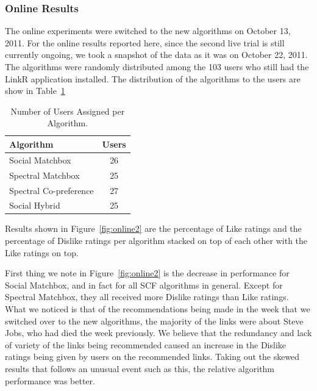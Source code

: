 \subsubsection{Online Results}
\label{sec:online2}

The online experiments were switched to the new algorithms on October
13, 2011. For the online results reported here, since the second live
trial is still currently ongoing, we took a snapshot of the data as it
was on October 22, 2011. The algorithms were randomly distributed
among the 103 users who still had the LinkR application installed. The
distribution of the algorithms to the users are show in
Table~\ref{tab:assigned2}


\begin{table}[t!]
\centering
\begin{tabular}{| l | c |}
\hline
{\bf Algorithm} & {\bf Users} \\
\hline
Social Matchbox & 26\\
Spectral Matchbox  & 25 \\
Spectral Co-preference & 27 \\
Social Hybrid & 25 \\
\hline
\end{tabular}
\caption{Number of Users Assigned per Algorithm.}
\label{tab:assigned2}
\end{table}

Results shown in Figure~\ref{fig:online2} are the percentage of Like
ratings and the percentage of Dislike ratings per algorithm stacked on
top of each other with the Like ratings on top.

First thing we note in Figure~\ref{fig:online2} is the decrease in
performance for Social Matchbox, and in fact for all SCF algorithms in
general. Except for Spectral Matchbox, they all received more Dislike
ratings than Like ratings. What we noticed is that of the
recommendations being made in the week that we switched over to the
new algorithms, the majority of the links were about Steve Jobs, who
had died the week previously. We believe that the redundancy and lack
of variety of the links being recommended caused an increase in the
Dislike ratings being given by users on the recommended links. Taking
out the skewed results that follows an unusual event such as this, the
relative algorithm performance was better.

